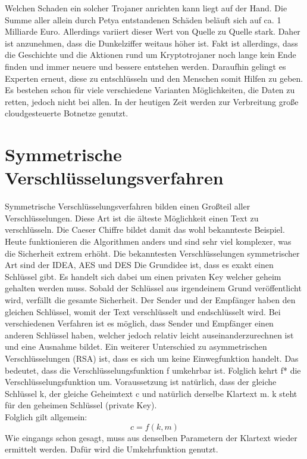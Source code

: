 Welchen Schaden ein solcher Trojaner anrichten kann liegt auf der Hand. Die Summe aller allein durch Petya entstandenen Schäden beläuft sich auf ca. 1 Milliarde Euro. Allerdings variiert dieser Wert von Quelle zu Quelle stark. Daher ist anzunehmen, dass die Dunkelziffer weitaus höher ist. Fakt ist allerdings, dass die Geschichte und die Aktionen rund um Kryptotrojaner noch lange kein Ende finden und immer neuere und bessere entstehen werden. Daraufhin gelingt es Experten erneut, diese zu entschlüsseln und den Menschen somit Hilfen zu geben. Es bestehen schon für viele verschiedene Varianten Möglichkeiten, die Daten zu retten, jedoch nicht bei allen. In der heutigen Zeit werden zur Verbreitung große cloudgesteuerte Botnetze genutzt.\\


\section{Symmetrische Verschlüsselungsverfahren}
Symmetrische Verschlüsselungsverfahren bilden einen Großteil aller Verschlüsselungen. Diese Art ist die älteste Möglichkeit einen Text zu verschlüsseln. Die Caeser Chiffre bildet damit das wohl bekannteste Beispiel. Heute funktionieren die Algorithmen anders und sind sehr viel komplexer, was die Sicherheit extrem erhöht. Die bekanntesten Verschlüsselungen symmetrischer Art sind der IDEA, AES und DES
Die Grundidee ist, dass es exakt einen Schlüssel gibt. Es handelt sich dabei um einen privaten Key welcher geheim gehalten werden muss. Sobald der Schlüssel aus irgendeinem Grund veröffentlicht wird, verfällt die gesamte Sicherheit. Der Sender und der Empfänger haben den gleichen Schlüssel, womit der Text verschlüsselt und endschlüsselt wird. Bei verschiedenen Verfahren ist es möglich, dass Sender und Empfänger einen anderen Schlüssel haben, welcher jedoch relativ leicht auseinanderzurechnen ist und eine Ausnahme bildet. Ein weiterer Unterschied zu asymmetrischen Verschlüsselungen (RSA) ist, dass es sich um keine Einwegfunktion handelt. Das bedeutet, dass die Verschlüsselungsfunktion f umkehrbar ist. Folglich kehrt f* die Verschlüsselungsfunktion um. Voraussetzung ist natürlich, dass der gleiche Schlüssel k, der gleiche Geheimtext c und natürlich derselbe Klartext m. k steht für den geheimen Schlüssel (private Key).\cite{RSABuch}\\

Folglich gilt allgemein:
\begin{equation}
	c = f(k,m)
\end{equation}
Wie eingangs schon gesagt, muss aus denselben Parametern der Klartext wieder ermittelt werden. Dafür wird die Umkehrfunktion genutzt.\\

